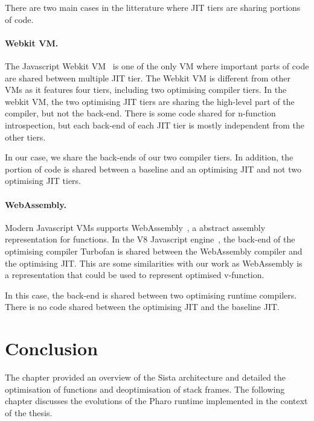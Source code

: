 \documentclass[a4paper,12pt,twoside]{../includes/ThesisStyle}
\begin{document}
There are two main cases in the litterature where JIT tiers are sharing portions of code.

\paragraph{Webkit VM.}The Javascript Webkit VM~\cite{Webkit15} is one of the only VM where important parts of code are shared between multiple JIT tier. The Webkit VM is different from other VMs as it features four tiers, including two optimising compiler tiers. In the webkit VM, the two optimising JIT tiers are sharing the high-level part of the compiler, but not the back-end. There is some code shared for n-function introspection, but each back-end of each JIT tier is mostly independent from the other tiers.

In our case, we share the back-ends of our two compiler tiers. In addition, the portion of code is shared between a baseline and an optimising JIT and not two optimising JIT tiers.

\paragraph{WebAssembly.}Modern Javascript VMs supports WebAssembly~\cite{WebAssembly}, a abstract assembly representation for functions. In the V8 Javascript engine~\cite{V8}, the back-end of the optimising compiler Turbofan is shared between the WebAssembly compiler and the optimising JIT. This are some similarities with our work as WebAssembly is a representation that could be used to represent optimised v-function. 

In this case, the back-end is shared between two optimising runtime compilers. There is no code shared between the optimising JIT and the baseline JIT. 


\section*{Conclusion}

The chapter provided an overview of the Sista architecture and detailed the optimisation of functions and deoptimisation of stack frames. The following chapter discusses the evolutions of the Pharo runtime implemented in the context of the thesis.

\ifx\wholebook\relax\else
    
\end{document}
